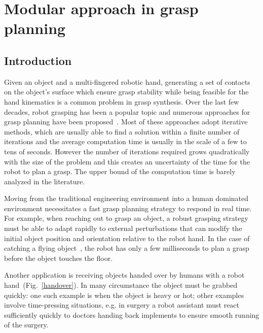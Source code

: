 \chapter{Modular approach in grasp planning}
\label{cha3}

\section{Introduction}
\label{cha3:sec1}


Given an object and a multi-fingered robotic hand,
generating a set of contacts on the object's surface which ensure grasp stability while being feasible for the hand kinematics is a common problem in grasp synthesis. Over the last few decades, robot grasping has been a popular topic and numerous approaches for grasp planning have been proposed~\cite{sahbani2011overview}. Most of these approaches adopt iterative methods, which are usually able to find a solution within a finite number of iterations and the average computation time is usually in the scale of a few to tens of seconds. However the number of iterations required grows quadratically with the size of the problem and this creates an uncertainty of the time for the robot to plan a grasp. The upper bound of the computation time is barely analyzed in the literature.


Moving from the traditional engineering environment into a human dominated environment necessitates a fast grasp planning strategy to respond in real time. For example, when reaching out to grasp an object, a robust grasping strategy must be able to adapt rapidly to external perturbations that can modify the initial object position and orientation relative to the robot hand. In the case of catching a flying object~\cite{kim2012}, the robot has only a few milliseconds to plan a grasp before the object touches the floor.

Another application is receiving objects handed over by humans with a robot hand~(Fig.~\ref{handover}). In many circumstance the object must be grabbed quickly: one such example is when the object is heavy or hot; other examples involve time-pressing situations, e.g. in surgery a robot assistant must react sufficiently quickly to doctors handing back implements to ensure smooth running of the surgery.

